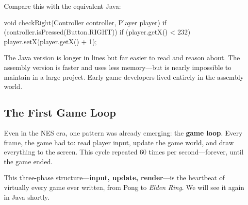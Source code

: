 \documentclass[11pt,letterpaper]{article}
\newcommand{\keyterm}[1]{\textbf{\textcolor{cssecondary}{#1}}}
\begin{document}
Compare this with the equivalent Java:

\begin{javacode}
void checkRight(Controller controller, Player player) {
    if (controller.isPressed(Button.RIGHT)) {
        if (player.getX() < 232) {
            player.setX(player.getX() + 1);
        }
    }
}
\end{javacode}

The Java version is longer in lines but far easier to read and reason about. The assembly version is faster and uses less memory---but is nearly impossible to maintain in a large project. Early game developers lived entirely in the assembly world.

\subsection{The First Game Loop}

Even in the NES era, one pattern was already emerging: the \keyterm{game loop}. Every frame, the game had to: read player input, update the game world, and draw everything to the screen. This cycle repeated 60 times per second---forever, until the game ended.

\begin{center}
\end{center}

This three-phase structure---\textbf{input, update, render}---is the heartbeat of virtually every game ever written, from Pong to \textit{Elden Ring}. We will see it again in Java shortly.
\end{document}
